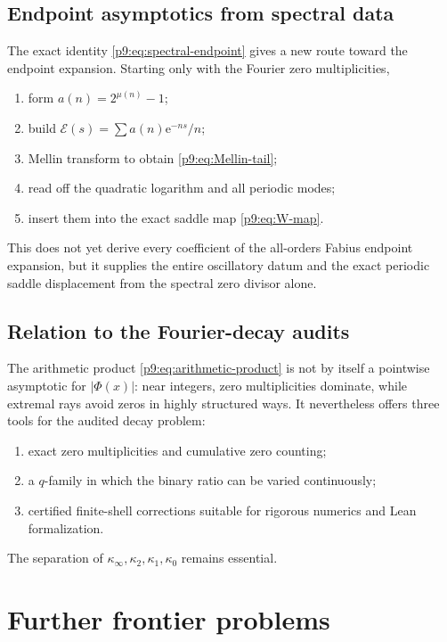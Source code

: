 \documentclass[11pt]{article}
\numberwithin{equation}{section}
\theoremstyle{definition}
\theoremstyle{remark}
\newcommand{\e}{\mathrm e}
\begin{document}
\subsection{Endpoint asymptotics from spectral data}
The exact identity \eqref{p9:eq:spectral-endpoint} gives a new route toward the endpoint
expansion.  Starting only with the Fourier zero multiplicities,
\begin{enumerate}
\item form $a(n)=2^{\mu(n)}-1$;
\item build $\mathcal E(s)=\sum a(n)\e^{-ns}/n$;
\item Mellin transform to obtain \eqref{p9:eq:Mellin-tail};
\item read off the quadratic logarithm and all periodic modes;
\item insert them into the exact saddle map \eqref{p9:eq:W-map}.
\end{enumerate}
This does not yet derive every coefficient of the all-orders Fabius endpoint expansion,
but it supplies the entire oscillatory datum and the exact periodic saddle displacement
from the spectral zero divisor alone.

\subsection{Relation to the Fourier-decay audits}
The arithmetic product \eqref{p9:eq:arithmetic-product} is not by itself a pointwise asymptotic
for $|\Phi(x)|$: near integers, zero multiplicities dominate, while extremal rays avoid
zeros in highly structured ways.  It nevertheless offers three tools for the audited
decay problem:
\begin{enumerate}
\item exact zero multiplicities and cumulative zero counting;
\item a $q$-family in which the binary ratio can be varied continuously;
\item certified finite-shell corrections suitable for rigorous numerics and Lean
formalization.
\end{enumerate}
The separation of $\kappa_\infty,\kappa_2,\kappa_1,\kappa_0$ remains essential.

\section{Further frontier problems}
\label{p9:sec:frontiers}
\end{document}
